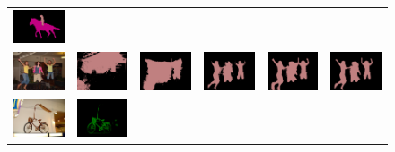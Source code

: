 \begin{figure}[!htbp]
{\begin{tabular}{c c c c c c}
    \includegraphics[height=0.11\linewidth]{fig/val_crf_vis/cocomix/2007_003022.png} \\
    \includegraphics[height=0.123\linewidth]{fig/val_crf_vis/img/2008_003546.jpg} &
    \includegraphics[height=0.123\linewidth]{fig/val_crf_vis/adaweak/2008_003546.png} &
    \includegraphics[height=0.123\linewidth]{fig/val_crf_vis/bbox/2008_003546.png} &
    \includegraphics[height=0.123\linewidth]{fig/val_crf_vis/bbox_crf/2008_003546.png} &
    \includegraphics[height=0.123\linewidth]{fig/val_crf_vis/strongweak/2008_003546.png} &
    \includegraphics[height=0.123\linewidth]{fig/val_crf_vis/cocomix/2008_003546.png} \\
    \includegraphics[height=0.123\linewidth]{fig/val_crf_vis/img/2008_004363.jpg} &
    \includegraphics[height=0.123\linewidth]{fig/val_crf_vis/adaweak/2008_004363.png} &

\end{tabular}}
\end{figure}
